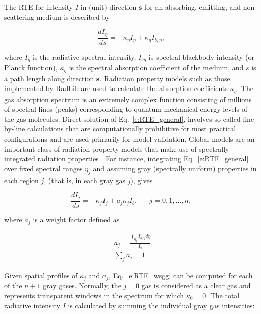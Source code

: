 \documentclass[preprint,12pt]{elsarticle}
\newcounter{bla}
\begin{document}
The RTE for intensity $I$ in (unit) direction $\mathbf{s}$ for an absorbing, emitting, and non-scattering medium is described by
% 
\begin{linenomath}
\begin{equation} \label{e:RTE_general}
    \frac{dI_{\eta}}{ds} = -\kappa_{\eta}I_{\eta} + \kappa_{\eta}I_{b,\eta},
\end{equation}
\end{linenomath}
%
where $I_{\eta}$ is the radiative spectral intensity, 
$I_{b\eta}$ is spectral blackbody intensity (or Planck function), 
$\kappa_{\eta}$ is the spectral absorption coefficient of the medium, and $s$ is a path length along direction $\mathbf{s}$. Radiation property models such as those implemented by RadLib are used to calculate the absorption coefficients $\kappa_{\eta}$. 
%
The gas absorption spectrum is an extremely complex function consisting of millions of spectral lines (peaks) corresponding to quantum mechanical energy levels of the gas molecules.
Direct solution of Eq.~\ref{e:RTE_general}, involves so-called line-by-line calculations that are computationally prohibitive for most practical configurations and are used primarily for model validation. Global models are an important class of radiation property models that make use of spectrally-integrated radiation properties \cite{Hottel_1967,Modest_2013}. For instance, integrating Eq.~\ref{e:RTE_general} over fixed spectral ranges $\eta_j$ and assuming gray (spectrally uniform) properties in each region $j$, (that is, in each gray gas $j$), gives
%
\begin{linenomath}
\begin{equation} \label{e:RTE_wsgg}
	\frac{dI_j}{ds} = -\kappa_jI_j + a_j\kappa_jI_b, \hspace{20pt} j=0,1,...,n,
\end{equation}
\end{linenomath}
%
where $a_j$ is a weight factor defined as
%
\begin{linenomath}
\begin{align}
    &a_j= \frac{\int_{\eta_j}I_{b,\eta}d\eta}{I_b},\\
    &\sum_j a_j = 1.
\end{align}
\end{linenomath}
%
Given spatial profiles of $\kappa_j$ and $a_j$, Eq.~\ref{e:RTE_wsgg} can be computed for each of the $n+1$ gray gases. Normally, the $j=0$ gas is considered as a clear gas and represents transparent windows in the spectrum for which $\kappa_0=0$.
The total radiative intensity $I$ is calculated by summing the individual gray gas intensities:
\end{document}

